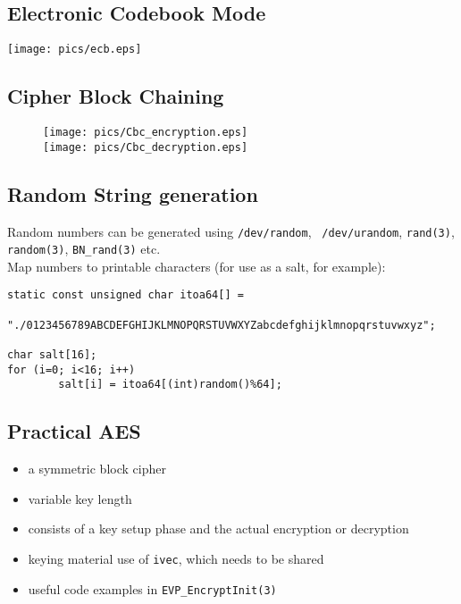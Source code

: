 \documentclass[xga]{xdvislides}
\begin{document}
\subsection{Electronic Codebook Mode}
\begin{center}
	\texttt{[image: pics/ecb.eps]}
\end{center}


\subsection{Cipher Block Chaining}
\begin{figure}[hb]
    \begin{center}
        \texttt{[image: pics/Cbc\_encryption.eps]} \\
        \texttt{[image: pics/Cbc\_decryption.eps]}
    \end{center}
\end{figure}

\subsection{Random String generation}
Random numbers can be generated using {\tt /dev/random}, {\tt
/dev/urandom}, {\tt rand(3)}, {\tt random(3)}, {\tt BN\_rand(3)} etc.
\\

Map numbers to printable characters (for use as a salt, for example):

\begin{verbatim}
static const unsigned char itoa64[] =
        "./0123456789ABCDEFGHIJKLMNOPQRSTUVWXYZabcdefghijklmnopqrstuvwxyz";

char salt[16];
for (i=0; i<16; i++)
        salt[i] = itoa64[(int)random()%64];

\end{verbatim}


\subsection{Practical AES}
\begin{itemize}
	\item a symmetric block cipher
	\item variable key length
	\item consists of a key setup phase and the actual encryption or
		decryption
	\item keying material use of {\tt ivec}, which needs to be shared
	\item useful code examples in {\tt EVP\_EncryptInit(3)}
\end{itemize}
\end{document}
